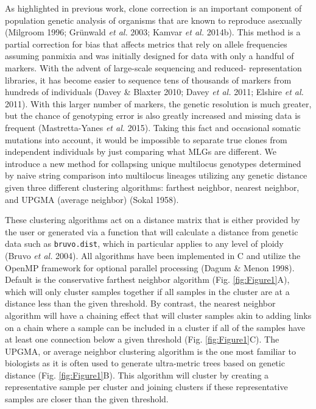 \documentclass[double,12pt]{beavtex}
\begin{document}
  As highlighted in previous work, clone correction is an important
  component of population genetic analysis of organisms that are known to
  reproduce asexually (Milgroom 1996; Grünwald \emph{et al.} 2003; Kamvar
  \emph{et al.} 2014b). This method is a partial correction for bias that
  affects metrics that rely on allele frequencies assuming panmixia and
  was initially designed for data with only a handful of markers. With the
  advent of large-scale sequencing and reduced- representation libraries,
  it has become easier to sequence tens of thousands of markers from
  hundreds of individuals (Davey \& Blaxter 2010; Davey \emph{et al.}
  2011; Elshire \emph{et al.} 2011). With this larger number of markers,
  the genetic resolution is much greater, but the chance of genotyping
  error is also greatly increased and missing data is frequent
  (Mastretta-Yanes \emph{et al.} 2015). Taking this fact and occasional
  somatic mutations into account, it would be impossible to separate true
  clones from independent individuals by just comparing what MLGs are
  different. We introduce a new method for collapsing unique multilocus
  genotypes determined by naive string comparison into multilocus lineages
  utilizing any genetic distance given three different clustering
  algorithms: farthest neighbor, nearest neighbor, and UPGMA (average
  neighbor) (Sokal 1958).
  
  These clustering algorithms act on a distance matrix that is either
  provided by the user or generated via a function that will calculate a
  distance from genetic data such as \texttt{bruvo.dist}, which in
  particular applies to any level of ploidy (Bruvo \emph{et al.} 2004).
  All algorithms have been implemented in C and utilize the OpenMP
  framework for optional parallel processing (Dagum \& Menon 1998).
  Default is the conservative farthest neighbor algorithm (Fig.
  \ref{fig:Figure1}A), which will only cluster samples together if all
  samples in the cluster are at a distance less than the given threshold.
  By contrast, the nearest neighbor algorithm will have a chaining effect
  that will cluster samples akin to adding links on a chain where a sample
  can be included in a cluster if all of the samples have at least one
  connection below a given threshold (Fig. \ref{fig:Figure1}C). The UPGMA,
  or average neighbor clustering algorithm is the one most familiar to
  biologists as it is often used to generate ultra-metric trees based on
  genetic distance (Fig. \ref{fig:Figure1}B). This algorithm will cluster
  by creating a representative sample per cluster and joining clusters if
  these representative samples are closer than the given threshold.
  
\end{document}
